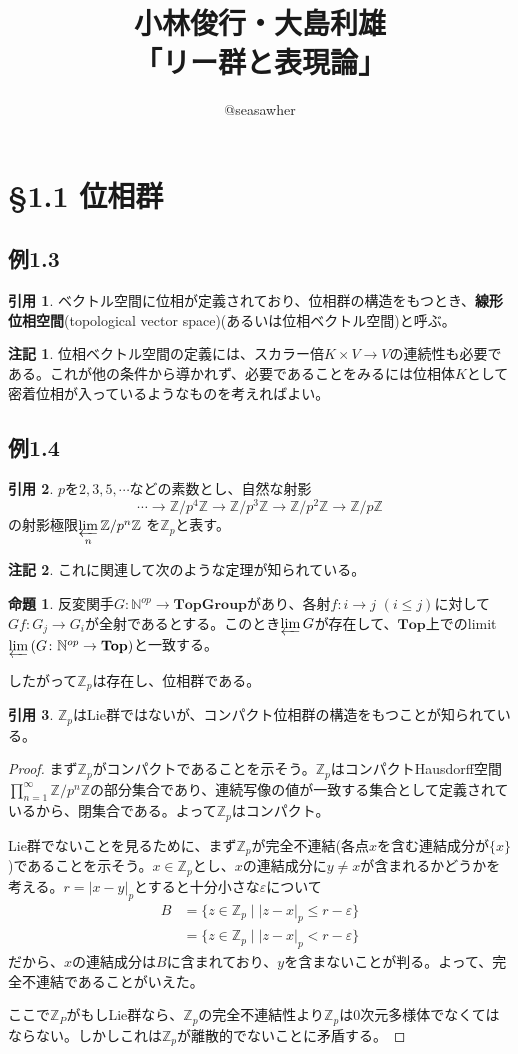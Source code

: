 \documentclass[12pt]{jsarticle}
\newcommand{\N}{\mathbb{N}}
\newcommand{\Z}{\mathbb{Z}}
\newcommand{\abs}[1]{\left \lvert #1 \right \rvert}%
\theoremstyle{definition}%
\newtheorem*{prop}{命題}
\newtheorem*{note}{注記}
\newtheorem*{quo}{引用}%
\renewenvironment{leftbar}{%
  \renewcommand\FrameCommand{\vrule width 1pt \hspace{10pt}}%
  \MakeFramed {\advance\hsize-\width \FrameRestore}}%
 {\endMakeFramed}
\newcommand{\barquo}[1]{\begin{leftbar} \begin{quo}  #1 \end{quo} \end{leftbar}}
\newcommand{\bfsubsection}[1]{\subsection*{\textbf{#1}}}
\begin{document}
\title{小林俊行・大島利雄\\「リー群と表現論」}
\author{@seasawher}
\maketitle

\section*{\S 1.1 位相群}

\bfsubsection{例1.3}
\barquo{ベクトル空間に位相が定義されており、位相群の構造をもつとき、\textbf{線形位相空間}(topological vector space)(あるいは位相ベクトル空間)と呼ぶ。}

\begin{note}
  位相ベクトル空間の定義には、スカラー倍$K \times V \to V$の連続性も必要である。これが他の条件から導かれず、必要であることをみるには位相体$K$として密着位相が入っているようなものを考えればよい。
  \end{note}

  \bfsubsection{例1.4}
  \barquo{
  $p$を$2,3,5, \cdots$などの素数とし、自然な射影
  \[
  \cdots \to \Z / p^4 \Z \to \Z / p^3 \Z \to \Z / p^2 \Z \to \Z / p \Z
  \]
  の射影極限$\varprojlim\limits_{n} \Z / p^n \Z $%
  を$\Z_p$と表す。
  }
  \begin{note}
    これに関連して次のような定理が知られている。
  \end{note}
\begin{prop}
  反変関手$G \colon \N^{op} \to \mathbf{TopGroup}$があり、各射$f \colon i \to j $ $(i \leq j)$に対して$Gf \colon G_j \to G_i$が全射であるとする。このとき$\varprojlim G$が存在して、$\mathbf{Top}$上でのlimit $\varprojlim \, (G \colon \N^{op} \to \mathbf{Top})$と一致する。
\end{prop}

したがって$\Z_p$は存在し、位相群である。

\barquo{
$\Z_p$はLie群ではないが、コンパクト位相群の構造をもつことが知られている。
}
\begin{proof}
  まず$\Z_p$がコンパクトであることを示そう。$\Z_p$はコンパクトHausdorff空間$\prod_{n=1}^{\infty} \Z / p^n \Z$の部分集合であり、連続写像の値が一致する集合として定義されているから、閉集合である。よって$\Z_p$はコンパクト。

  Lie群でないことを見るために、まず$\Z_p$が完全不連結(各点$x$を含む連結成分が$\{ x\}$)であることを示そう。$x \in \Z_p$とし、$x$の連結成分に$y \neq x$が含まれるかどうかを考える。$r = \abs{x-y}_p$とすると十分小さな$\varepsilon$について
\begin{align*}
  B &= \{ z \in \Z_p \mid \abs{z-x}_p \leq r - \varepsilon \} \\
  &= \{ z \in \Z_p \mid \abs{z-x}_p < r - \varepsilon \}
\end{align*}
だから、$x$の連結成分は$B$に含まれており、$y$を含まないことが判る。よって、完全不連結であることがいえた。

ここで$\Z_P$がもしLie群なら、$\Z_p$の完全不連結性より$\Z_p$は0次元多様体でなくてはならない。しかしこれは$\Z_p$が離散的でないことに矛盾する。
\end{proof}
\end{document}
